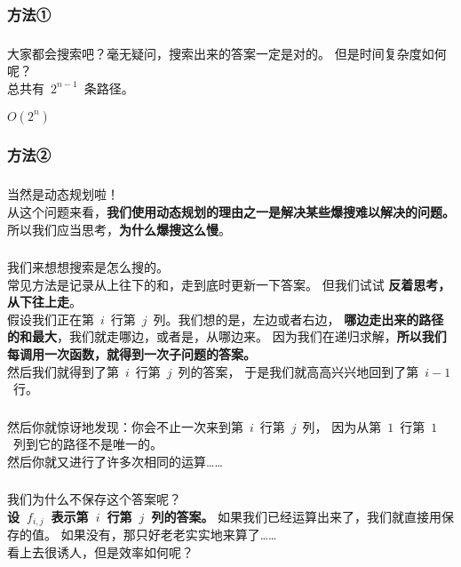 \documentclass[UTF8]{beamer}
\begin{document}
	\subsubsection{方法①}
	\begin{frame}
		\frametitle{\insertsubsubsection}
		大家都会搜索吧？毫无疑问，搜索出来的答案一定是对的。
		但是时间复杂度如何呢？
		\\\pause
		\vspace{5mm}
		总共有~$2^{n - 1}$~条路径。
		\begin{center}
			$O(2^{n})$
		\end{center}
	\end{frame}

	\subsubsection{方法②}
	\begin{frame}
		\frametitle{\insertsubsubsection}
		当然是动态规划啦！
		\\
		从这个问题来看，\textbf{我们使用动态规划的理由之一是解决某些爆搜难以解决的问题。}
		\\
		所以我们应当思考，\textbf{为什么爆搜这么慢}。
	\end{frame}

	\begin{frame}
		\frametitle{\insertsubsubsection}
		我们来想想搜索是怎么搜的。
		\\
		常见方法是记录从上往下的和，走到底时更新一下答案。
		但我们试试 \textbf{反着思考，从下往上走}。
		\\
		假设我们正在第~$i$~行第~$j$~列。我们想的是，左边或者右边，
		\textbf{哪边走出来的路径的和最大}，我们就走哪边，或者是，从哪边来。
		因为我们在递归求解，\textbf{所以我们每调用一次函数，就得到一次子问题的答案。}
		\\\pause
		然后我们就得到了第~$i$~行第~$j$~列的答案，
		于是我们就高高兴兴地回到了第~$i - 1$~行。
	\end{frame}

	\begin{frame}
		\frametitle{\insertsubsubsection}
		然后你就惊讶地发现：你会不止一次来到第~$i$~行第~$j$~列，
		因为从第~$1$~行第~$1$~列到它的路径不是唯一的。
		\\
		然后你就又进行了许多次相同的运算……
	\end{frame}

	\begin{frame}
		\frametitle{\insertsubsubsection}
		我们为什么不保存这个答案呢？
		\\
		\textbf{设~$f_{i, j}$~表示第~$i$~行第~$j$~列的答案。}
		如果我们已经运算出来了，我们就直接用保存的值。
		如果没有，那只好老老实实地来算了……
		\\\pause
		看上去很诱人，但是效率如何呢？
	\end{frame}
\end{document}
